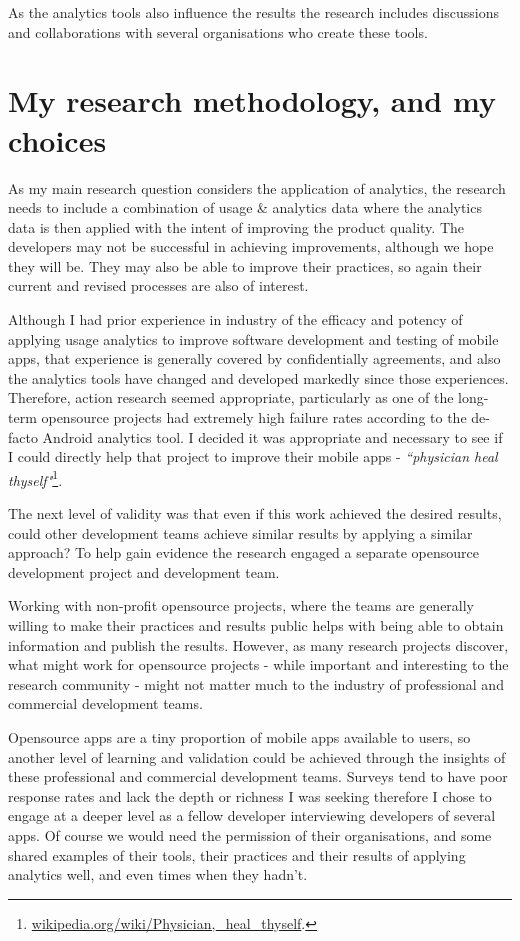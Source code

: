 As the analytics tools also influence the results the research includes discussions and collaborations with several organisations who create these tools.


\section{My research methodology, and my choices}
As my main research question considers the application of analytics, the research needs to include a combination of usage \& analytics data where the analytics data is then applied with the intent of improving the product quality. The developers may not be successful in achieving improvements, although we hope they will be. They may also be able to improve their practices, so again their current and revised processes are also of interest.

Although I had prior experience in industry of the efficacy and potency of applying usage analytics to improve software development and testing of mobile apps, that experience is generally covered by confidentially agreements, and also the analytics tools have changed and developed markedly since those experiences. Therefore, action research seemed appropriate, particularly as one of the long-term opensource projects had extremely high failure rates according to the de-facto Android analytics tool. I decided it was appropriate and necessary to see if I could directly help that project to improve their mobile apps - \emph{``physician heal thyself"}\footnote{\href{https://en.wikipedia.org/wiki/Physician,\_heal\_thyself}{wikipedia.org/wiki/Physician,\_heal\_thyself}.}.

The next level of validity was that even if this work achieved the desired results, could other development teams achieve similar results by applying a similar approach? To help gain evidence the research engaged a separate opensource development project and development team. 

Working with non-profit opensource projects, where the teams are generally willing to make their practices and results public helps with being able to obtain information and publish the results. However, as many research projects discover, what might work for opensource projects - while important and interesting to the research community - might not matter much to the industry of professional and commercial development teams. 

Opensource apps are a tiny proportion of mobile apps available to users, so another level of learning and validation could be achieved through the insights of these professional and commercial development teams. Surveys tend to have poor response rates and lack the depth or richness I was seeking therefore I chose to engage at a deeper level as a fellow developer interviewing developers of several apps. Of course we would need the permission of their organisations, and some shared examples of their tools, their practices and their results of applying analytics well, and even times when they hadn't.

